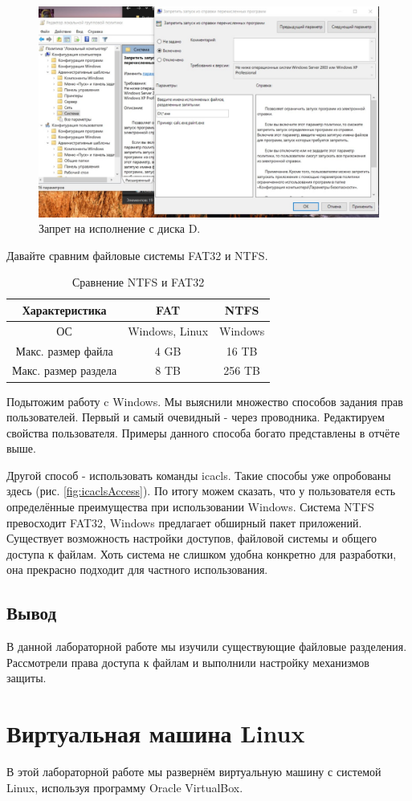 \begin{figure}[h!]
    \centering
    \includegraphics[width=0.5\linewidth]{Pic/lab3/photo_2025-05-23_21-54-11.jpg}
    \caption{Запрет на исполнение с диска D.}
    \label{fig:exed}
\end{figure}
\newpage
Давайте сравним файловые системы FAT32 и NTFS. 
\begin{table}[h!]
    \centering
    \begin{tabular}{|c|c|c|}
    \hline
    Характеристика&FAT&NTFS\\
    \hline
    ОС&Windows, Linux&Windows\\
    \hline
    Макс. размер файла&4 GB&16 TB\\
    \hline
    Макс. размер раздела&8 TB&256 TB\\
    \hline
    \end{tabular}
    \caption{Сравнение NTFS и FAT32}
    \label{tab:31}
\end{table}
\newpage
Подытожим работу c Windows. Мы выяснили множество способов задания прав пользователей. Первый и самый очевидный - через проводника. Редактируем свойства пользователя. Примеры данного способа богато представлены в отчёте выше.

Другой способ - использовать команды icacls. Такие способы уже опробованы здесь (рис. \ref{fig:icaclsAccess}). По итогу можем сказать, что у пользователя есть определённые преимущества при использовании Windows. Система NTFS превосходит FAT32, Windows предлагает обширный пакет приложений. Существует возможность настройки доступов, файловой системы и общего доступа к файлам. Хоть система не слишком удобна конкретно для разработки, она прекрасно подходит для частного использования. 
\subsection{Вывод}
В данной лабораторной работе мы изучили существующие файловые разделения. Рассмотрели права доступа к файлам и выполнили настройку механизмов защиты. 
\newpage
\section{Виртуальная машина Linux}
В этой лабораторной работе мы развернём виртуальную машину с системой Linux, используя программу Oracle VirtualBox. 

